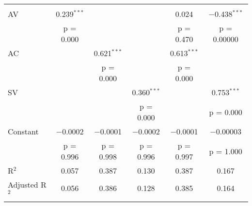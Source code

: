 
\begin{tabular}{@{\extracolsep{5pt}}lccccc} 
\\[-1.8ex]
\hline \\[-1.8ex] 
 AV & 0.239$^{***}$ &  &  & 0.024 & $-$0.438$^{***}$ \\ 
  & p = 0.000 &  &  & p = 0.470 & p = 0.00000 \\ 
 AC &  & 0.621$^{***}$ &  & 0.613$^{***}$ &  \\ 
  &  & p = 0.000 &  & p = 0.000 &  \\ 
 SV &  &  & 0.360$^{***}$ &  & 0.753$^{***}$ \\ 
  &  &  & p = 0.000 &  & p = 0.000 \\ 
 Constant & $-$0.0002 & $-$0.0001 & $-$0.0002 & $-$0.0001 & $-$0.00003 \\ 
  & p = 0.996 & p = 0.998 & p = 0.996 & p = 0.997 & p = 1.000 \\ 
R$^{2}$ & 0.057 & 0.387 & 0.130 & 0.387 & 0.167 \\ 
Adjusted R$^{2}$ & 0.056 & 0.386 & 0.128 & 0.385 & 0.164 \\ 
\hline \\[-1.8ex] 
\end{tabular} 
